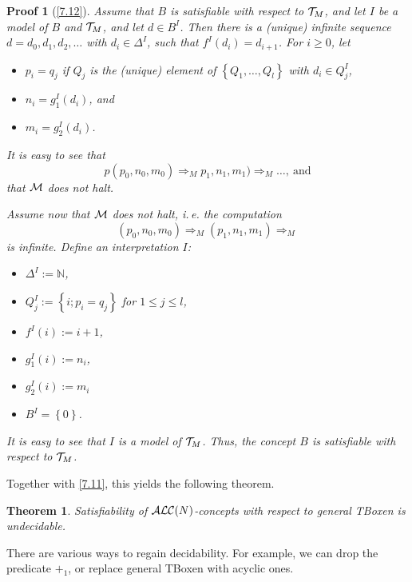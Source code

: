 \documentclass[openany]{scrbook}
\theoremstyle{break}
\newtheorem{Theorem}{Theorem}[chapter]
\theoremstyle{nonumberbreak}
\theoremstyle{nonumberplain}
\theoremstyle{nonumberbreak}
\newtheorem{Proof}{Proof}
\newcommand{\then}{\Longrightarrow}
\newcommand{\N}{\mathbb{N}}
\newcommand{\set}[1]{\left\{#1\right\}}
\newcommand{\ie}{i{.}\,e{.}\xspace}
\newcommand{\ALC}{{\cal A}{\cal L}{\cal C}}
\begin{document}
\begin{Proof}[\cref{7.12}]
  Assume that $B$ is satisfiable with respect to ${\cal T}_M$, and let
  $I$ be a model of $B$ and ${\cal T}_M$, and let $d \in B^I$. Then
  there is a (unique) infinite sequence $d = d_0, d_1, d_2, \dotsc$
  with $d_i \in \Delta^I$, such that $f^I(d_i) = d_{i + 1}$. For $i
  \geq 0$, let
  \begin{itemize}
  \item $p_i = q_j$ if $Q_j$ is the (unique) element of $\set{Q_1,
      \dotsc, Q_l}$ with $d_i \in Q_j^I$,
  \item $n_i = g_1^I(d_i)$, and
  \item $m_i = g_2^I(d_i)$.
  \end{itemize}

  It is easy to see that
  \begin{equation*}p
    (p_0, n_0, m_0) \then_M p_1, n_1, m_1) \then_M \dotso,\ \text{and}
  \end{equation*}
  that ${\cal M}$ does not halt.

  Assume now that ${\cal M}$ does not halt, \ie the computation
  \begin{equation*}
    (p_0, n_0, m_0) \then_M (p_1, n_1, m_1) \then_M
  \end{equation*}
  is infinite. Define an interpretation $I$:
  \begin{itemize}
  \item $\Delta^I := \N$,
  \item $Q_j^I := \set{i; p_i = q_j}$ for $1 \leq j \leq l$,
  \item $f^I(i) := i + 1$,
  \item $g_1^I(i) := n_i$,
  \item $g_2^I(i) := m_i$
  \item $B^I = \set{0}$.
  \end{itemize}

  It is easy to see that $I$ is a model of ${\cal T}_M$. Thus, the
  concept $B$ is satisfiable with respect to ${\cal T}_M$.
\end{Proof}

Together with \cref{7.11}, this yields the following theorem.

\begin{Theorem}
  \label{7.13}
  Satisfiability of $\ALC(N)$-concepts with respect to general TBoxen
  is undecidable.
\end{Theorem}

There are various ways to regain decidability.  For example, we can
drop the predicate $+_1$, or replace general TBoxen with acyclic ones.
\end{document}
